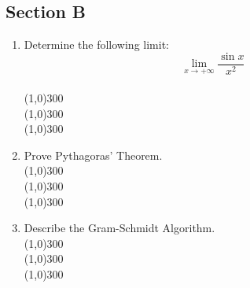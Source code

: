 \documentclass{article}
\begin{document}
\subsection*{Section B}

\begin{enumerate}

\item Determine the following limit:
\begin{equation*}
\lim_{x \to +\infty} \frac{\sin{x}}{x^2}
\end{equation*}
\\\line(1,0){300}
\\\line(1,0){300}
\\\line(1,0){300}

\item Prove Pythagoras' Theorem.
\\\line(1,0){300}
\\\line(1,0){300}
\\\line(1,0){300}

\item Describe the Gram-Schmidt Algorithm.
\\\line(1,0){300}
\\\line(1,0){300}
\\\line(1,0){300}

\end{enumerate}
\end{document}
